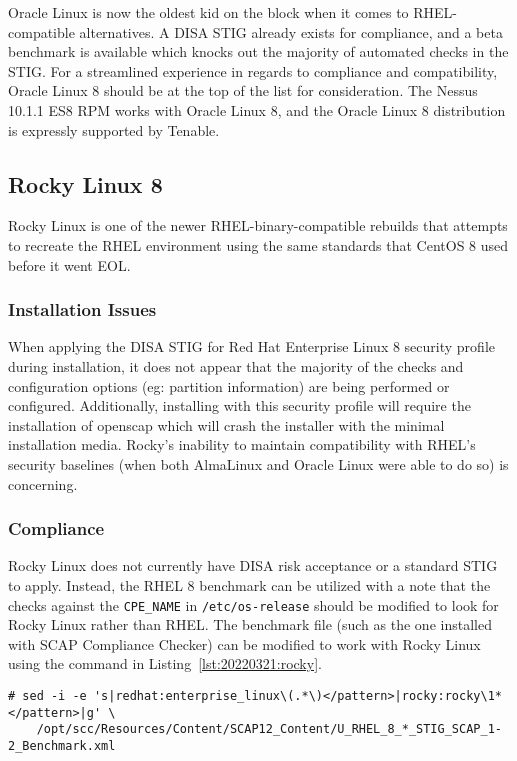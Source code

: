 Oracle Linux is now the oldest kid on the block when it comes to RHEL-compatible alternatives. A DISA STIG already exists for compliance, and a beta benchmark is available which knocks out the majority of automated checks in the STIG. For a streamlined experience in regards to compliance and compatibility, Oracle Linux 8 should be at the top of the list for consideration. The Nessus 10.1.1 ES8 RPM works with Oracle Linux 8, and the Oracle Linux 8 distribution is expressly supported by Tenable.

\subsection{Rocky Linux 8}
Rocky Linux is one of the newer RHEL-binary-compatible rebuilds that attempts to recreate the RHEL environment using the same standards that CentOS 8 used before it went EOL.

\subsubsection{Installation Issues}
When applying the DISA STIG for Red Hat Enterprise Linux 8 security profile during installation, it does not appear that the majority of the checks and configuration options (eg: partition information) are being performed or configured. Additionally, installing with this security profile will require the installation of openscap which will crash the installer with the minimal installation media. Rocky's inability to maintain compatibility with RHEL's security baselines (when both AlmaLinux and Oracle Linux were able to do so) is concerning.

\subsubsection{Compliance}
Rocky Linux does not currently have DISA risk acceptance or a standard STIG to apply. Instead, the RHEL 8 benchmark can be utilized with a note that the checks against the \texttt{CPE\_NAME} in \texttt{/etc/os-release} should be modified to look for Rocky Linux rather than RHEL. The benchmark file (such as the one installed with SCAP Compliance Checker) can be modified to work with Rocky Linux using the command in Listing~\ref{lst:20220321:rocky}.

\begin{lstlisting}[caption={Modify RHEL Benchmark for Rocky Linux},captionpos=b,style=BashStyle,basicstyle=\small,label={lst:20220321:rocky},literate=*{-}{-}1,breaklines=true]
# sed -i -e 's|redhat:enterprise_linux\(.*\)</pattern>|rocky:rocky\1*</pattern>|g' \
	/opt/scc/Resources/Content/SCAP12_Content/U_RHEL_8_*_STIG_SCAP_1-2_Benchmark.xml
\end{lstlisting}

